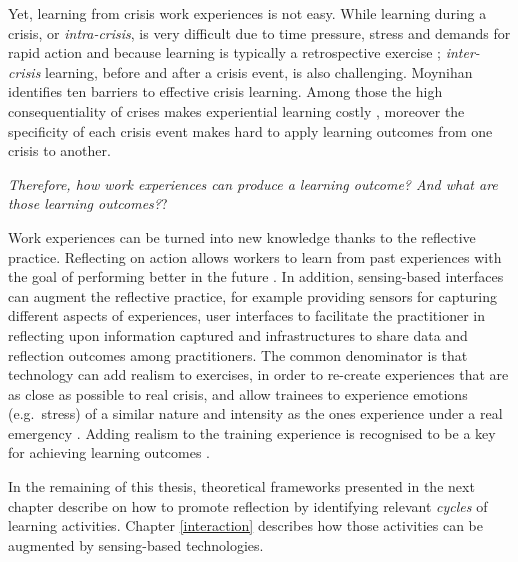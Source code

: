 Yet, learning from crisis work experiences is not easy. While learning during a crisis, or \emph{intra-crisis}, is very difficult due to time pressure, stress and demands for rapid action \autocite{Deverell:2009fk} and because learning is typically a retrospective exercise \autocite{jasanoff1994learning}; \emph{inter-crisis} learning, before and after a crisis event, is also challenging. Moynihan \autocite*{Moynihan:2008gq} identifies ten barriers to effective crisis learning. Among those the high consequentiality of crises makes experiential learning costly \autocite{LaPorte:1991gk}, moreover the specificity of each crisis event makes hard to apply learning outcomes from one crisis to another.

\emph{Therefore, how work experiences can produce a learning outcome? And what are those learning outcomes?}?

Work experiences can be turned into new knowledge thanks to the reflective practice. Reflecting on action allows workers to learn from past experiences with the goal of performing better in the future \autocites{boud1985reflection}{Schon:1983ut}. In addition, sensing-based interfaces can augment the reflective practice, for example providing sensors for capturing different aspects of experiences, user interfaces to facilitate the practitioner in reflecting upon information captured and infrastructures to share data and reflection outcomes among practitioners. The common denominator is that technology can add realism to exercises, in order to re-create experiences that are as close as possible to real crisis, and allow trainees to experience emotions (e.g.~stress) of a similar nature and intensity as the ones experience under a real emergency \autocite{MacKinnon:2012wz}. Adding realism to the training experience is recognised to be a key for achieving learning outcomes \autocite{Asproth:2013vs}.

In the remaining of this thesis, theoretical frameworks presented in the next chapter describe on how to promote reflection by identifying relevant \emph{cycles} of learning activities. Chapter \ref{interaction} describes how those activities can be augmented by sensing-based technologies. 
